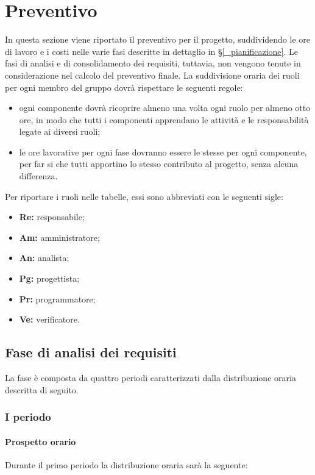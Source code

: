 \section{Preventivo} \label{_preventivo}
In questa sezione viene riportato il preventivo per il progetto, suddividendo le ore di lavoro e i costi nelle varie fasi descritte in dettaglio in \S\ref{_pianificazione}.
Le fasi di analisi e di consolidamento dei requisiti, tuttavia, non vengono tenute in considerazione nel calcolo del preventivo finale.
La suddivisione oraria dei ruoli per ogni membro del gruppo dovrà rispettare le seguenti regole:
\begin{itemize}
	\item ogni componente dovrà ricoprire almeno una volta ogni ruolo per almeno otto ore, in modo che tutti i componenti apprendano le attività e le responsabilità legate ai diversi ruoli;
	\item le ore lavorative per ogni fase dovranno essere le stesse per ogni componente, per far si che tutti apportino lo stesso contributo al progetto, senza alcuna differenza.
\end{itemize}
Per riportare i ruoli nelle tabelle, essi sono abbreviati con le seguenti sigle:
\begin{itemize}
	\item\textbf{Re:} responsabile;
	\item\textbf{Am:} amministratore;
	\item\textbf{An:} analista;
	\item\textbf{Pg:} progettista;
	\item\textbf{Pr:} programmatore;
	\item\textbf{Ve:} verificatore.
\end{itemize}

\subsection{Fase di analisi dei requisiti}
La fase è composta da quattro periodi caratterizzati dalla distribuzione oraria descritta di seguito.

\subsubsection{I periodo}
\paragraph{Prospetto orario}
Durante il primo periodo la distribuzione oraria sarà la seguente:

